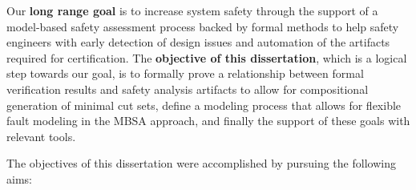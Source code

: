 Our \textbf{long range goal} is to increase system safety through the support of a model-based safety assessment process backed by formal methods to help safety engineers with early detection of design issues and automation of the artifacts required for certification. The \textbf{objective of this dissertation}, which is a logical step towards our goal, is to formally prove a relationship between formal verification results and safety analysis artifacts to allow for compositional generation of minimal cut sets, define a modeling process that allows for flexible fault modeling in the MBSA approach, and finally the support of these goals with relevant tools.
%
\iffalse
The main focus of this research work is to define algorithms and formulate theoretical proofs that make use of verification results in order to extract information about the fault model. The secondary focus is the development of a safety analysis tool that works closely with existing verification engines and implements the theories in the first step.
\fi
%
The objectives of this dissertation were accomplished by pursuing the following aims: 

